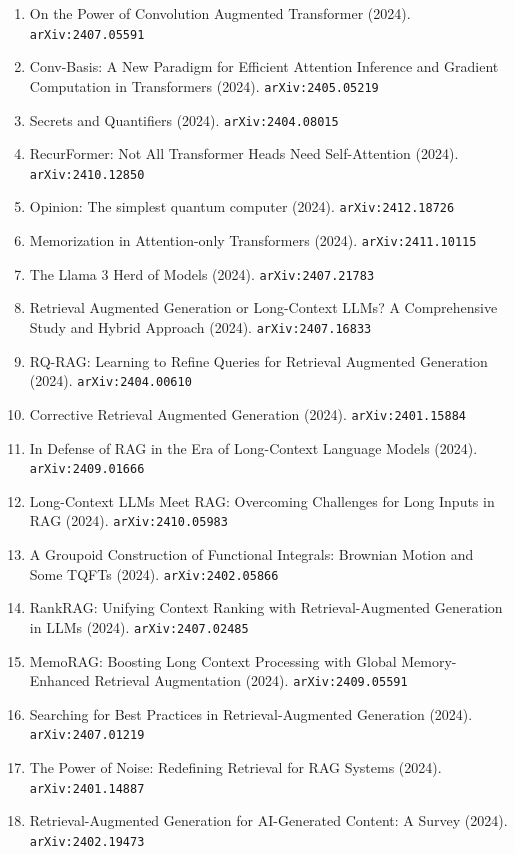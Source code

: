 \documentclass[11pt]{article}
\begin{document}
\begin{enumerate}
  \item On the Power of Convolution Augmented Transformer (2024). \texttt{arXiv:2407.05591}
  \item Conv-Basis: A New Paradigm for Efficient Attention Inference and
  Gradient Computation in Transformers (2024). \texttt{arXiv:2405.05219}
  \item Secrets and Quantifiers (2024). \texttt{arXiv:2404.08015}
  \item RecurFormer: Not All Transformer Heads Need Self-Attention (2024). \texttt{arXiv:2410.12850}
  \item Opinion: The simplest quantum computer (2024). \texttt{arXiv:2412.18726}
  \item Memorization in Attention-only Transformers (2024). \texttt{arXiv:2411.10115}
  \item The Llama 3 Herd of Models (2024). \texttt{arXiv:2407.21783}
  \item Retrieval Augmented Generation or Long-Context LLMs? A Comprehensive
  Study and Hybrid Approach (2024). \texttt{arXiv:2407.16833}
  \item RQ-RAG: Learning to Refine Queries for Retrieval Augmented Generation (2024). \texttt{arXiv:2404.00610}
  \item Corrective Retrieval Augmented Generation (2024). \texttt{arXiv:2401.15884}
  \item In Defense of RAG in the Era of Long-Context Language Models (2024). \texttt{arXiv:2409.01666}
  \item Long-Context LLMs Meet RAG: Overcoming Challenges for Long Inputs in RAG (2024). \texttt{arXiv:2410.05983}
  \item A Groupoid Construction of Functional Integrals: Brownian Motion and
  Some TQFTs (2024). \texttt{arXiv:2402.05866}
  \item RankRAG: Unifying Context Ranking with Retrieval-Augmented Generation in
  LLMs (2024). \texttt{arXiv:2407.02485}
  \item MemoRAG: Boosting Long Context Processing with Global Memory-Enhanced
  Retrieval Augmentation (2024). \texttt{arXiv:2409.05591}
  \item Searching for Best Practices in Retrieval-Augmented Generation (2024). \texttt{arXiv:2407.01219}
  \item The Power of Noise: Redefining Retrieval for RAG Systems (2024). \texttt{arXiv:2401.14887}
  \item Retrieval-Augmented Generation for AI-Generated Content: A Survey (2024). \texttt{arXiv:2402.19473}

\end{enumerate}
\end{document}
